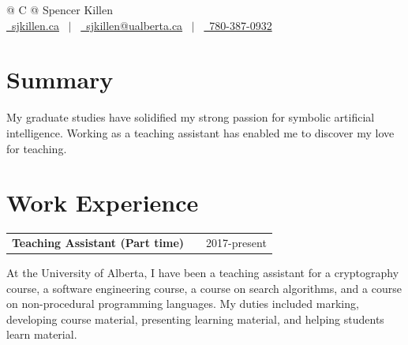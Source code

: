 \documentclass[a4paper,12pt]{article}
\makeatletter
\newenvironment{jobshort}[2]
    {
    \begin{tabularx}{\linewidth}{@{}l X r@{}}
    \textbf{#1} & \hfill &  #2 \\[3.75pt]
    \end{tabularx}
    }
    {
    }
\makeatother
\begin{document}
\pagestyle{empty}



\begin{tabularx}{\linewidth}{@{} C @{}}
\Huge{Spencer Killen} \\[7.5pt]
\href{https://sjkillen.ca}{\raisebox{-0.05\height}\faGlobe \ sjkillen.ca} \ $|$ \
\href{mailto:sjkillen@ualberta.ca}{\raisebox{-0.05\height}\faEnvelope \ sjkillen@ualberta.ca} \ $|$ \
\href{tel:+17803870932}{\raisebox{-0.05\height}\faMobile \ 780-387-0932} \\
\end{tabularx}


\section{Summary}
My graduate studies have solidified my strong passion for symbolic artificial intelligence.
Working as a teaching assistant has enabled me to discover my love for teaching.

\section{Work Experience}

\begin{jobshort}{Teaching Assistant (Part time)}{2017-present}
    At the University of Alberta, I have been a teaching assistant for a cryptography course, a software engineering course, a course on search algorithms, and a course on non-procedural programming languages.
    My duties included marking, developing course material, presenting learning material, and helping students learn material.
\end{jobshort}
\end{document}
